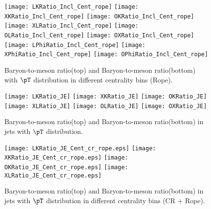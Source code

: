 \begin{figure}[ht]
        \begin{center}
                \texttt{[image: LKRatio\_Incl\_Cent\_rope]}
                \texttt{[image: XKRatio\_Incl\_Cent\_rope]}
                \texttt{[image: OKRatio\_Incl\_Cent\_rope]}
                \texttt{[image: XLRatio\_Incl\_Cent\_rope]}
                \texttt{[image: OLRatio\_Incl\_Cent\_rope]}
                \texttt{[image: OXRatio\_Incl\_Cent\_rope]}
                \texttt{[image: LPhiRatio\_Incl\_Cent\_rope]}
                \texttt{[image: XPhiRatio\_Incl\_Cent\_rope]}
                \texttt{[image: OPhiRatio\_Incl\_Cent\_rope]}
        \end{center}
	\caption{Baryon-to-meson ratio(top) and Baryon-to-meson ratio(bottom) with $\pT$ distribution in different centrality bins (Rope).}
        \label{fig:InclParRatioCentrope}
\end{figure}





\begin{figure}[ht]
        \begin{center}
                \texttt{[image: LKRatio\_JE]}
                \texttt{[image: XKRatio\_JE]}
                \texttt{[image: OKRatio\_JE]}
                \texttt{[image: XLRatio\_JE]}
                \texttt{[image: OLRatio\_JE]}
                \texttt{[image: OXRatio\_JE]}
        \end{center}
        \caption{Baryon-to-meson ratio(top) and Baryon-to-meson ratio(bottom) in jets with $\pT$ distribution.}
        \label{fig:JEParRatio}
\end{figure}

\begin{figure}[ht]
        \begin{center}
                \texttt{[image: LKRatio\_JE\_Cent\_cr\_rope.eps]}
                \texttt{[image: XKRatio\_JE\_Cent\_cr\_rope.eps]}
                \texttt{[image: OKRatio\_JE\_Cent\_cr\_rope.eps]}
                \texttt{[image: XLRatio\_JE\_Cent\_cr\_rope.eps]}
        \end{center}
	\caption{Baryon-to-meson ratio(top) and Baryon-to-meson ratio(bottom) in jets with $\pT$ distribution in different centrality bins (CR + Rope).}
        \label{fig:JEParRatioCentcrandrope}
\end{figure}

